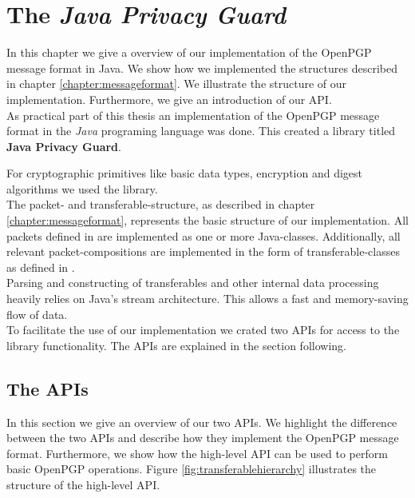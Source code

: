 \chapter{The \textit{Java Privacy Guard}} \label{chapter:jpg}

In this chapter we give a overview of our implementation of the OpenPGP message format in Java. We show how we implemented the structures described in chapter \ref{chapter:messageformat}. We illustrate the structure of our implementation. Furthermore, we give an introduction of our API. \\


As practical part of this thesis an implementation of the OpenPGP message format \cite{RFC4880} in the \textit{Java} programing language was done. This created a library titled \textbf{Java Privacy Guard}.

For cryptographic primitives like basic data types, encryption and digest algorithms we used the  library. \\

The packet- and transferable-structure, as described in chapter \ref{chapter:messageformat}, represents the basic structure of our implementation. All packets defined in \cite[section 5]{RFC4880} are implemented as one or more Java-classes. Additionally, all relevant packet-compositions are implemented in the form of transferable-classes as defined in \cite[section 11]{RFC4880}. \\

Parsing and constructing of transferables and other internal data processing heavily relies on Java's stream architecture. This allows a fast and memory-saving flow of data. \\

To facilitate the use of our implementation we crated two APIs for access to the library functionality. The APIs are explained in the section following.

\section{The APIs}

In this section we give an overview of our two APIs. We highlight the difference between the two APIs and describe how they implement the OpenPGP message format. Furthermore, we show how the high-level API can be used to perform basic OpenPGP operations. Figure \ref{fig:transferablehierarchy} illustrates the structure of the high-level API. \\


